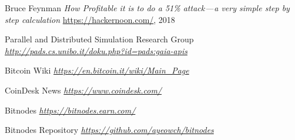 \begin{thebibliography}{99}
 Bruce Feynman
{\em How Profitable it is to do a 51\% attack — a very simple step by step calculation}
\url{https://hackernoon.com/}, 2018

 Parallel and Distributed Simulation Research Group
{\em \url{http://pads.cs.unibo.it/doku.php?id=pads:gaia-apis}}

 Bitcoin Wiki
{\em \url{https://en.bitcoin.it/wiki/Main_Page}}

 CoinDesk News
{\em \url{https://www.coindesk.com/}}

 Bitnodes
{\em \url{https://bitnodes.earn.com/}}

\bibitem[bitnodesgh] Bitnodes Repository
{\em \url{https://github.com/ayeowch/bitnodes}}

\end{thebibliography}

